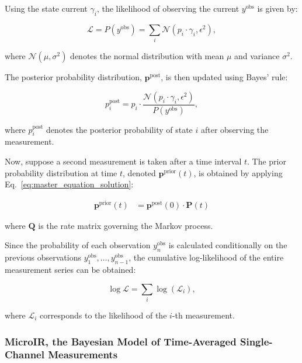\documentclass[pdflatex,sn-mathphys-num]{sn-jnl}%
\theoremstyle{thmstyleone}%
\theoremstyle{thmstyletwo}%
\theoremstyle{thmstylethree}%
\begin{document}
Using the state current $\gamma_i$, the likelihood of observing the current \( y^{\text{obs}} \) is given by:

\begin{equation}
	\mathcal{L} = P(y^{\text{obs}}) = \sum_i \mathcal{N}(p_i \cdot \gamma_i, \epsilon^2),
	\label{eq:single_channel_likelihood}
\end{equation}

where \( \mathcal{N}(\mu, \sigma^2) \) denotes the normal distribution with mean \( \mu \) and variance \( \sigma^2 \).

The posterior probability distribution, \( \boldsymbol{p}^{\text{post}} \), is then updated using Bayes' rule:

\begin{equation}
	p^{\text{post}}_i = p_i \cdot \frac{\mathcal{N}(p_i \cdot \gamma_i, \epsilon^2)}{P(y^{\text{obs}})},
	\label{eq:single_channel_posterior}
\end{equation}

where \( p^{\text{post}}_i \) denotes the posterior probability of state \( i \) after observing the measurement.

Now, suppose a second measurement is taken after a time interval \( t \). The prior probability distribution at time \( t \), denoted \( \boldsymbol{p}^{\text{prior}}(t) \), is obtained by applying Eq.~\ref{eq:master_equation_solution}:

\begin{align}
	\boldsymbol{p}^{\text{prior}}(t) &= \boldsymbol{p}^{\text{post}}(0) \cdot \boldsymbol{P}(t)
	\label{eq:prior_update}
\end{align}

where \( \boldsymbol{Q} \) is the rate matrix governing the Markov process.

Since the probability of each observation \( {y}_n^{\text{obs}} \) is calculated conditionally on the previous observations \( {y}_1^{\text{obs}}, \dots, {y}_{n-1}^{\text{obs}} \), the cumulative log-likelihood of the entire measurement series can be obtained:

\begin{equation}
	\log \mathcal{L} = \sum_i \log (\mathcal{L}_i),
	\label{eq:total_loglikelihood}
\end{equation}

where \( \mathcal{L}_i \) corresponds to the likelihood of the \( i \)-th measurement.


\subsubsection{MicroIR, the Bayesian Model of Time-Averaged Single-Channel Measurements}
\end{document}
